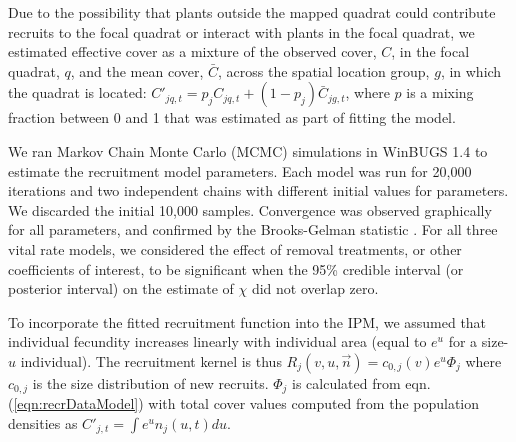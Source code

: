 \documentclass[11pt]{article}
\begin{document}
Due to the possibility that plants outside the mapped quadrat could contribute recruits to the focal quadrat or interact with plants in the focal quadrat, we estimated effective cover as a mixture of the observed cover, $C$, in the focal quadrat, $q$, and the mean cover, $\bar{C}$, across the spatial location group, $g$, in which the 
quadrat is located: $C'_{jq,t}=p_j C_{jq,t}+(1-p_j) \bar{C}_{jg,t}$, where $p$ is a mixing fraction between 0 and 1 that was estimated as part of fitting the model.

We ran Markov Chain Monte Carlo (MCMC) simulations in WinBUGS 1.4 \citep{lunn_winbugs_2000} to estimate the recruitment model parameters. Each model was run for 20,000 iterations and two independent chains with different initial values for parameters. We discarded the initial 10,000 samples. Convergence was observed graphically for all parameters, and confirmed by the Brooks-Gelman statistic \citep{brooks_general_1998}. For all three vital rate models, we considered the effect of removal treatments, or other coefficients of interest, to be significant when the 95\% credible interval (or posterior interval) on the estimate of $\chi$ did not overlap zero.  

To incorporate the fitted recruitment function into the IPM, we assumed that individual fecundity increases 
linearly with individual area (equal to $e^u$ for a size-$u$ individual). The recruitment kernel is thus
$R_j(v,u,\vec{n})=c_{0,j}(v)e^{u}\Phi_j$ \citep{adler_coexistence_2010} where $c_{0,j}$ is the
size distribution of new recruits. $\Phi_j$ is calculated from eqn. (\ref{eqn:recrDataModel}) with total cover values computed from the population densities as $C'_{j,t} = \int e^u n_j(u,t) du$. 
\end{document}
